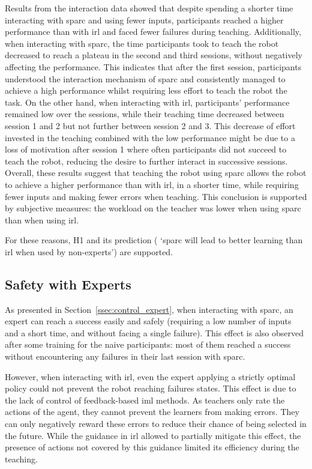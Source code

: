 Results from the interaction data showed that despite spending a shorter time interacting with \gls{sparc} and using fewer inputs, participants reached a higher performance than with \gls{irl} and faced fewer failures during teaching. Additionally, when interacting with \gls{sparc}, the time participants took to teach the robot decreased to reach a plateau in the second and third sessions, without negatively affecting the performance. This indicates that after the first session, participants understood the interaction mechanism of \gls{sparc} and consistently managed to achieve a high performance whilst requiring less effort to teach the robot the task. On the other hand, when interacting with \gls{irl}, participants' performance remained low over the sessions, while their teaching time decreased between session 1 and 2 but not further between session 2 and 3. This decrease of effort invested in the teaching combined with the low performance might be due to a loss of motivation after session 1 where often participants did not succeed to teach the robot, reducing the desire to further interact in successive sessions. Overall, these results suggest that teaching the robot using \gls{sparc} allows the robot to achieve a higher performance than with \gls{irl}, in a shorter time, while requiring fewer inputs and making fewer errors when teaching. This conclusion is supported by subjective measures: the workload on the teacher was lower when using \gls{sparc} than when using \gls{irl}. 

For these reasons, H1 and its prediction ( `\gls{sparc} will lead to better learning than \gls{irl} when used by non-experts') are supported.

\subsection{Safety with Experts}

As presented in Section~\ref{ssec:control_expert}, when interacting with \gls{sparc}, an expert can reach a success easily and safely (requiring a low number of inputs and a short time, and without facing a single failure). This effect is also observed after some training for the naive participants: most of them reached a success without encountering any failures in their last session with \gls{sparc}.

However, when interacting with \gls{irl}, even the expert applying a strictly optimal policy could not prevent the robot reaching failures states. This effect is due to the lack of control of feedback-based \gls{iml} methods. As teachers only rate the actions of the agent, they cannot prevent the learners from making errors. They can only negatively reward these errors to reduce their chance of being selected in the future. While the guidance in \gls{irl} allowed to partially mitigate this effect, the presence of actions not covered by this guidance limited its efficiency during the teaching.

